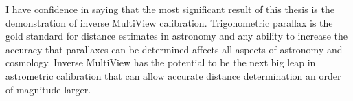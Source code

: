 	I have confidence in saying that the most significant result of this thesis is the demonstration of inverse MultiView calibration. Trigonometric parallax is the gold standard for distance estimates in astronomy and any ability to increase the accuracy that parallaxes can be determined affects all aspects of astronomy and cosmology. Inverse MultiView has the potential to be the next big leap in astrometric calibration that can allow accurate distance determination an order of magnitude larger.
	
